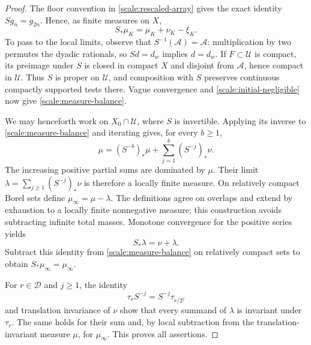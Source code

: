 \begin{proof}
The floor convention in \cref{scale:rescaled-array} gives the exact
identity $Sg_n=g_{2n}$. Hence, as finite measures on $X$,
\begin{equation}\label{scale:finite-measure-balance}
 S_*\mu_K=\mu_K+\nu_K-\xi_K.
\end{equation}
To pass to the local limits, observe that $S^{-1}(\mathcal A)
=\mathcal A$: multiplication by two permutes the dyadic rationals,
so $Sd=d_w$ implies $d=d_w$. If $F\subset\mathcal U$ is compact,
its preimage under $S$ is closed in compact $X$ and disjoint from
$\mathcal A$, hence compact in $\mathcal U$. Thus $S$ is proper
on $\mathcal U$, and composition with $S$ preserves continuous
compactly supported tests there. Vague convergence and
\cref{scale:initial-negligible} now give
\cref{scale:measure-balance}.

We may henceforth work on $X_0\cap\mathcal U$, where $S$ is
invertible. Applying its inverse to \cref{scale:measure-balance}
and iterating gives, for every $b\ge1$,
\[
 \mu=(S^{-b})_*\mu+\sum_{j=1}^{b}(S^{-j})_*\nu.
\]
The increasing positive partial sums are dominated by $\mu$.
Their limit
$\lambda=\sum_{j\ge1}(S^{-j})_*\nu$ is therefore a locally finite
measure. On relatively compact Borel sets define
$\mu_\infty=\mu-\lambda$. The definitions agree on overlaps and
extend by exhaustion to a locally finite nonnegative measure;
this construction avoids subtracting infinite total masses.
Monotone convergence for the positive series yields
\[
 S_*\lambda=\nu+\lambda.
\]
Subtract this identity from \cref{scale:measure-balance} on
relatively compact sets to obtain $S_*\mu_\infty=\mu_\infty$.

For $r\in\mathcal D$ and $j\ge1$, the identity
\[
 \tau_r S^{-j}=S^{-j}\tau_{r/2^j}
\]
and translation invariance of $\nu$ show that every summand of
$\lambda$ is invariant under $\tau_r$. The same holds for their
sum and, by local subtraction from the translation-invariant
measure $\mu$, for $\mu_\infty$. This proves all assertions.
\end{proof}
